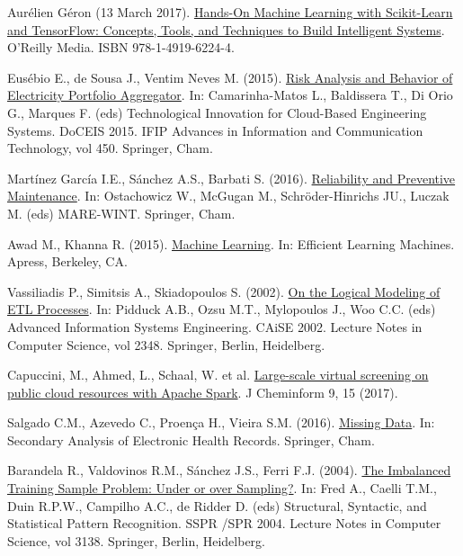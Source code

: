 \documentclass[LaM,binding=0.6cm, english]{sapthesis}
\begin{document}
\cleardoublepage
{} %
\begin{thebibliography}{9}

Aurélien Géron (13 March 2017). \href{https://books.google.com/books?id=bRpYDgAAQBAJ}{Hands-On Machine Learning with Scikit-Learn and TensorFlow: Concepts, Tools, and Techniques to Build Intelligent Systems}. O'Reilly Media. ISBN 978-1-4919-6224-4.

Eusébio E., de Sousa J., Ventim Neves M. (2015). \href{https://doi.org/10.1007/978-3-319-16766-4_39}{Risk Analysis and Behavior of Electricity Portfolio Aggregator}. In: Camarinha-Matos L., Baldissera T., Di Orio G., Marques F. (eds) Technological Innovation for Cloud-Based Engineering Systems. DoCEIS 2015. IFIP Advances in Information and Communication Technology, vol 450. Springer, Cham.

Martínez García I.E., Sánchez A.S., Barbati S. (2016). \href{https://doi.org/10.1007/978-3-319-39095-6_15}{Reliability and Preventive Maintenance}. In: Ostachowicz W., McGugan M., Schröder-Hinrichs JU., Luczak M. (eds) MARE-WINT. Springer, Cham.

Awad M., Khanna R. (2015). \href{https://doi.org/10.1007/978-1-4302-5990-9_1}{Machine Learning}. In: Efficient Learning Machines. Apress, Berkeley, CA.

Vassiliadis P., Simitsis A., Skiadopoulos S. (2002). \href{https://doi.org/10.1007/3-540-47961-9_67}{On the Logical Modeling of ETL Processes}. In: Pidduck A.B., Ozsu M.T., Mylopoulos J., Woo C.C. (eds) Advanced Information Systems Engineering. CAiSE 2002. Lecture Notes in Computer Science, vol 2348. Springer, Berlin, Heidelberg.

Capuccini, M., Ahmed, L., Schaal, W. et al. \href{https://doi.org/10.1007/3-540-47961-9_67}{Large-scale virtual screening on public cloud resources with Apache Spark}. J Cheminform 9, 15 (2017).

Salgado C.M., Azevedo C., Proença H., Vieira S.M. (2016). \href{https://doi.org/10.1007/978-3-319-43742-2_13}{Missing Data}. In: Secondary Analysis of Electronic Health Records. Springer, Cham.

Barandela R., Valdovinos R.M., Sánchez J.S., Ferri F.J. (2004). \href{https://doi.org/10.1007/978-3-540-27868-9_88}{The Imbalanced Training Sample Problem: Under or over Sampling?}. In: Fred A., Caelli T.M., Duin R.P.W., Campilho A.C., de Ridder D. (eds) Structural, Syntactic, and Statistical Pattern Recognition. SSPR /SPR 2004. Lecture Notes in Computer Science, vol 3138. Springer, Berlin, Heidelberg.


\end{thebibliography}
\end{document}
